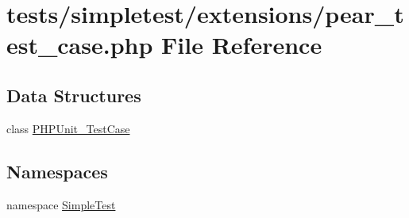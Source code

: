 \hypertarget{pear__test__case_8php}{\section{tests/simpletest/extensions/pear\-\_\-test\-\_\-case.php File Reference}
\label{pear__test__case_8php}
}
\subsection*{Data Structures}
\begin{DoxyCompactItemize}
\item 
class \hyperlink{class_p_h_p_unit___test_case}{P\-H\-P\-Unit\-\_\-\-Test\-Case}
\end{DoxyCompactItemize}
\subsection*{Namespaces}
\begin{DoxyCompactItemize}
\item 
namespace \hyperlink{namespace_simple_test}{Simple\-Test}
\end{DoxyCompactItemize}
